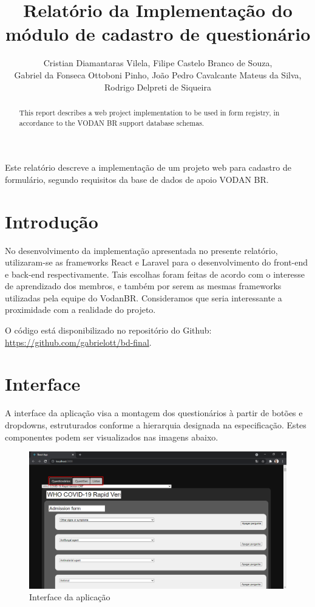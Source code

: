 \documentclass[12pt]{article}
\title{Relatório da Implementação do módulo
	de cadastro de questionário }
\author{
	Cristian Diamantaras Vilela\inst{1},
	Filipe Castelo Branco de Souza\inst{1},\\
	Gabriel da Fonseca Ottoboni Pinho\inst{1},
	João Pedro Cavalcante Mateus da Silva\inst{1},\\
	Rodrigo Delpreti de Siqueira\inst{1}
}
\begin{document}
 

\maketitle

\begin{abstract}
  This report describes a web project implementation
  to be used in form registry, in accordance to the
  VODAN BR support database schemas.
\end{abstract}
     
\begin{resumo} 
  Este relatório descreve a implementação
  de um projeto web
  para cadastro de formulário,
  segundo requisitos da base de dados
  de apoio VODAN BR.
\end{resumo}

\section{Introdução}

No desenvolvimento da implementação
apresentada no presente relatório,
utilizaram-se as frameworks React e Laravel
para o desenvolvimento do front-end e back-end
respectivamente. 
Tais escolhas foram feitas de acordo com
o interesse de aprendizado dos membros,
e também por serem as mesmas
frameworks utilizadas pela equipe do VodanBR.
Consideramos que seria interessante a proximidade
com a realidade do projeto.

O código está disponibilizado no repositório do
Github: \url{https://github.com/gabrielott/bd-final}.

\section{Interface} \label{sec:firstpage}

A interface da aplicação visa a montagem
dos questionários à partir de botões e dropdowns,
estruturados conforme a hierarquia designada na especificação.
Estes componentes podem ser visualizados nas imagens abaixo.

\begin{figure}[ht]
	\centering
	\includegraphics[width=.5\textwidth]{front.png}
	\caption{Interface da aplicação}
	\label{fig:Figura1}
\end{figure}
\end{document}

